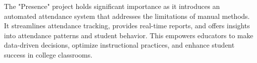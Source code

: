 The "Presence" project holds significant importance as it introduces an automated attendance system that addresses the limitations of manual methods. It streamlines attendance tracking, provides real-time reports, and offers insights into attendance patterns and student behavior. This empowers educators to make data-driven decisions, optimize instructional practices, and enhance student success in college classrooms.
